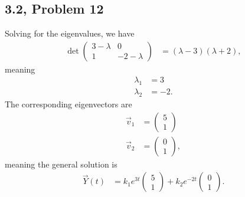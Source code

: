 \documentclass[10pt]{mypackage}
\begin{document}
\subsection{3.2, Problem 12}%
Solving for the eigenvalues, we have
\begin{align*}
  \det \begin{pmatrix}3-\lambda & 0 \\ 1 & -2-\lambda\end{pmatrix} &= \left(\lambda - 3\right)\left(\lambda + 2\right),
\end{align*}
meaning
\begin{align*}
  \lambda_1 &= 3\\
  \lambda_2 &= -2.
\end{align*}
The corresponding eigenvectors are
\begin{align*}
  \vec{v}_1 &=  \begin{pmatrix}5\\1\end{pmatrix}\\
  \vec{v}_2 &= \begin{pmatrix}0\\1\end{pmatrix},
\end{align*}
meaning the general solution is
\begin{align*}
  \vec{Y}(t) &= k_1e^{3t} \begin{pmatrix}5\\1\end{pmatrix} + k_2e^{-2t} \begin{pmatrix}0\\1\end{pmatrix}.
\end{align*}
\end{document}
